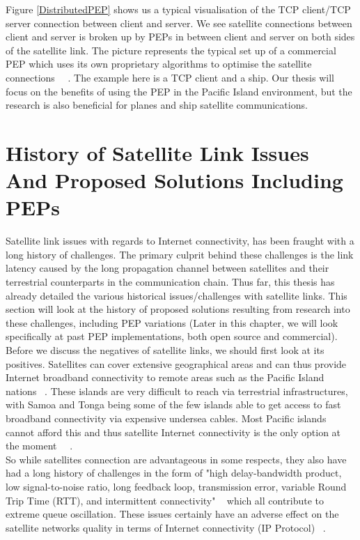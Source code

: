 Figure \ref{DistributedPEP} shows us a typical visualisation of the TCP client/TCP server connection between client and server. We see satellite connections between client and server is broken up by PEPs in between client and server on both sides of the satellite link. The picture represents the typical set up of a commercial PEP which uses its own proprietary algorithms to optimise the satellite connections ~\cite{6}~\cite{14}. The example here is a TCP client and a ship. Our thesis will focus on the benefits of using the PEP in the Pacific Island environment, but the research is also beneficial for planes and ship satellite communications. \\

\section{History of Satellite Link Issues And Proposed Solutions Including PEPs}\label{History}
Satellite link issues with regards to Internet connectivity, has been fraught with a long history of challenges. The primary culprit behind these challenges is the link latency caused by the long propagation channel between satellites and their terrestrial counterparts in the communication chain. Thus far, this thesis has already detailed the various historical issues/challenges with satellite links. This section will look at the history of proposed solutions resulting from research into these challenges, including PEP variations (Later in this chapter, we will look specifically at past PEP implementations, both open source and commercial). \\

Before we discuss the negatives of satellite links, we should first look at its positives. Satellites can cover extensive geographical areas and can thus provide Internet broadband connectivity to remote areas such as the Pacific Island nations ~\cite{15}. These islands are very difficult to reach via terrestrial infrastructures, with Samoa and Tonga being some of the few islands able to get access to fast broadband connectivity via expensive undersea cables. Most Pacific islands cannot afford this and thus satellite Internet connectivity is the only option at the moment ~\cite{3}~\cite{4}. \\

So while satellites connection are advantageous in some respects, they also have had a long history of challenges in the form of "high delay-bandwidth product, low signal-to-noise ratio, long feedback loop, transmission error, variable Round Trip Time (RTT), and intermittent connectivity" ~\cite{15} which all contribute to extreme queue oscillation. These issues certainly have an adverse effect on the satellite networks quality in terms of Internet connectivity (IP Protocol) ~\cite{15}. \\

